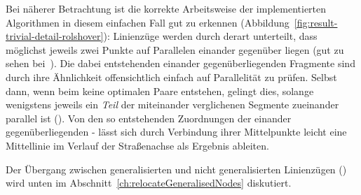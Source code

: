 \documentclass[../main/thesis.tex]{subfiles}
\begin{document}

Bei näherer Betrachtung ist die korrekte Arbeitsweise der implementierten Algorithmen in diesem einfachen Fall gut zu erkennen (Abbildung~\ref{fig:result-trivial-detail-rolshover}):
Linienzüge werden durch  derart unterteilt, dass möglichst jeweils zwei Punkte auf Parallelen einander gegenüber liegen (gut zu sehen bei~).
Die dabei entstehenden einander gegenüberliegenden Fragmente sind durch ihre Ähnlichkeit offensichtlich einfach auf Parallelität zu prüfen.
Selbst dann, wenn beim  keine optimalen Paare entstehen, gelingt dies, solange wenigstens jeweils ein \emph{Teil} der miteinander verglichenen Segmente zueinander parallel ist ().
Von den so entstehenden Zuordnungen der einander gegenüberliegenden \osm- lässt sich durch Verbindung ihrer Mittelpunkte leicht eine Mittellinie im Verlauf der Straßenachse als Ergebnis ableiten.

Der Übergang zwischen generalisierten und nicht generalisierten Linienzügen () wird unten im Abschnitt~\ref{ch:relocateGeneralisedNodes} diskutiert.
\end{document}
